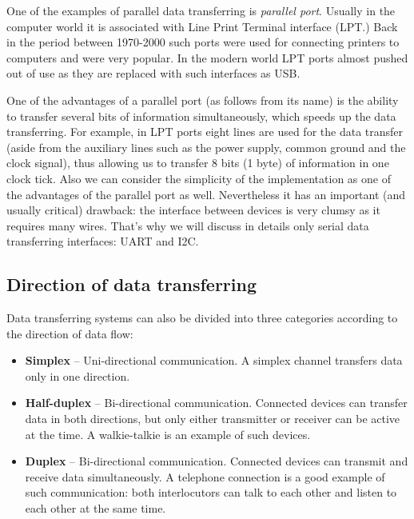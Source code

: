 \documentclass[../sparc.tex]{subfiles}
\begin{document}

One of the examples of parallel data transferring is \emph{parallel port}.
Usually in the computer world it is associated with Line Print Terminal
interface (\gls{LPT}.)  Back in the period between 1970-2000 such ports were
used for connecting printers to computers and were very popular.  In the modern
world LPT ports almost pushed out of use as they are replaced with such
interfaces as USB.

One of the advantages of a parallel port (as follows from its name) is the
ability to transfer several bits of information simultaneously, which speeds up
the data transferring.  For example, in LPT ports eight lines are used for the
data transfer (aside from the auxiliary lines such as the power supply, common
ground and the clock signal), thus allowing us to transfer 8 bits (1 byte) of
information in one clock tick.  Also we can consider the simplicity of the
implementation as one of the advantages of the parallel port as well.
Nevertheless it has an important (and usually critical) drawback: the interface
between devices is very clumsy as it requires many wires.  That's why we will
discuss in details only serial data transferring interfaces: \gls{UART} and I2C.


\subsection{Direction of data transferring}

Data transferring systems can also be divided into three categories according to
the direction of data flow:

\begin{itemize}
\item \textbf{Simplex} -- Uni-directional communication.  A simplex channel
  transfers data only in one direction.
\item \textbf{Half-duplex} -- Bi-directional communication.  Connected devices
  can transfer data in both directions, but only either transmitter or receiver
  can be active at the time.  A walkie-talkie is an example of such devices.
\item \textbf{Duplex} -- Bi-directional communication.  Connected devices can
  transmit and receive data simultaneously.  A telephone connection is a good
  example of such communication: both interlocutors can talk to each other and
  listen to each other at the same time.
\end{itemize}
\end{document}
